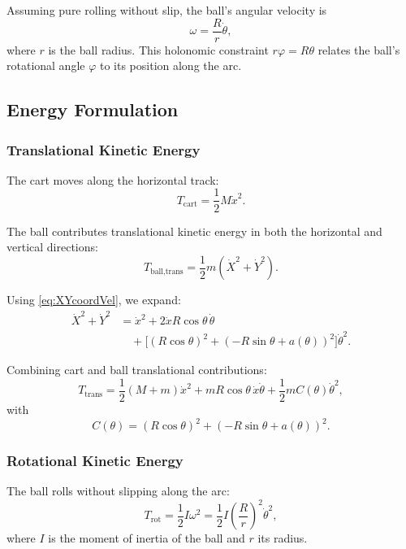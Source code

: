 Assuming pure rolling without slip, the ball's angular velocity is
\begin{equation}
\omega = \frac{R}{r} \dot\theta,
\end{equation}
where $r$ is the ball radius. This holonomic constraint $r \varphi = R \theta$ relates the ball's rotational angle $\varphi$ to its position along the arc.

\subsection{Energy Formulation}

\subsubsection{Translational Kinetic Energy}
The cart moves along the horizontal track:
\begin{equation}
T_\text{cart} = \frac{1}{2} M \dot x^2.
\end{equation}

The ball contributes translational kinetic energy in both the horizontal and vertical directions:
\begin{equation}
T_\text{ball,trans} = \frac{1}{2} m (\dot X^2 + \dot Y^2).
\end{equation}

Using \eqref{eq:XYcoordVel}, we expand:
\begin{equation}
\begin{split}
\dot X^2 + \dot Y^2 &= \dot x^2 + 2 \dot x R \cos\theta \, \dot\theta \\[2pt]
&\quad + \bigl[ (R\cos\theta)^2 + (-R\sin\theta + a(\theta))^2 \bigr] \dot\theta^2.
\end{split}
\end{equation}

Combining cart and ball translational contributions:
\begin{equation}
T_\text{trans} = \frac{1}{2}(M+m)\dot x^2 + m R \cos\theta \, \dot x \dot\theta + \frac{1}{2} m C(\theta) \dot\theta^2,
\end{equation}
with
\begin{equation}
C(\theta) = (R\cos\theta)^2 + (-R\sin\theta + a(\theta))^2.
\end{equation}

\subsubsection{Rotational Kinetic Energy}
The ball rolls without slipping along the arc:
\begin{equation}
T_\text{rot} = \frac{1}{2} I \omega^2 = \frac{1}{2} I \left(\frac{R}{r}\right)^2 \dot\theta^2,
\end{equation}
where $I$ is the moment of inertia of the ball and $r$ its radius.

